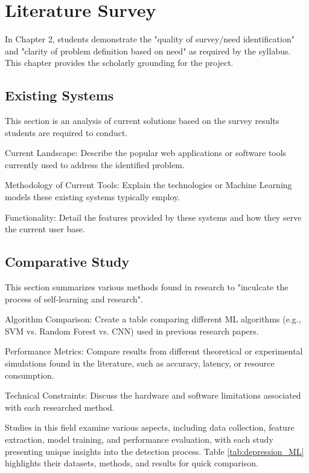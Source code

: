 
\chapter{Literature Survey}

In Chapter 2, students demonstrate the "quality of survey/need identification" and "clarity of problem definition based on need"  as required by the syllabus. This chapter provides the scholarly grounding for the project.

\section{Existing Systems}

This section is an analysis of current solutions based on the survey results students are required to conduct.

Current Landscape: Describe the popular web applications or software tools currently used to address the identified problem.

Methodology of Current Tools: Explain the technologies or Machine Learning models these existing systems typically employ.

Functionality: Detail the features provided by these systems and how they serve the current user base.

\section{Comparative Study}
This section summarizes various methods found in research to "inculcate the process of self-learning and research".

Algorithm Comparison: Create a table comparing different ML algorithms (e.g., SVM vs. Random Forest vs. CNN) used in previous research papers.

Performance Metrics: Compare results from different theoretical or experimental simulations found in the literature, such as accuracy, latency, or resource consumption.

Technical Constraints: Discuss the hardware and software limitations associated with each researched method.

Studies in this field examine various aspects, including data collection, feature extraction, model training, and performance evaluation, with each study presenting unique insights into the detection process. Table \ref{tab:depression_ML} highlights their datasets, methods, and results for quick comparison.

